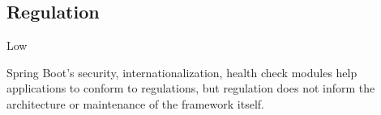 \subsection*{Regulation}

\ranking Low

Spring Boot's security, internationalization, health check modules help applications to conform to regulations, but regulation does not inform the architecture or maintenance of the framework itself.